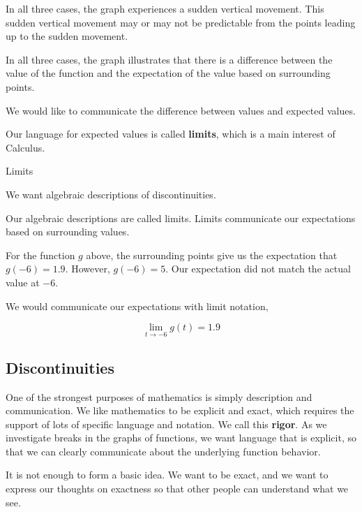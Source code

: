 \documentclass{ximera}
\begin{document}
In all three cases, the graph experiences a sudden vertical movement.  This sudden vertical movement may or may not be predictable from the points leading up to the sudden movement.


In all three cases, the graph illustrates that there is a difference between the value of the function and the expectation of the value based on surrounding points. 

We would like to communicate the difference between values and expected values.

Our language for expected values is called \textbf{limits}, which is a main interest of Calculus.


\begin{example} Limits

We want algebraic descriptions of discontinuities.

Our algebraic descriptions are called limits. Limits communicate our expectations based on surrounding values.

For the function $g$ above, the surrounding points give us the expectation that $g(-6)=1.9$.  However, $g(-6)=5$.  Our expectation did not match the actual value at $-6$.

We would communicate our expectations with limit notation,


\[ \lim\limits_{t \to -6} g(t) = 1.9 \]



\end{example}
















\subsection*{Discontinuities}

One of the strongest purposes of mathematics is simply description and communication.  We like mathematics to be explicit and exact, which requires the support of lots of specific language and notation. We call this \textbf{\textcolor{purple!85!blue}{rigor}}. As we investigate breaks in the graphs of functions, we want language that is explicit, so that we can clearly communicate about the underlying function behavior.

It is not enough to form a basic idea. We want to be exact, and we want to express our thoughts on exactness so that other people can understand what we see.
\end{document}
